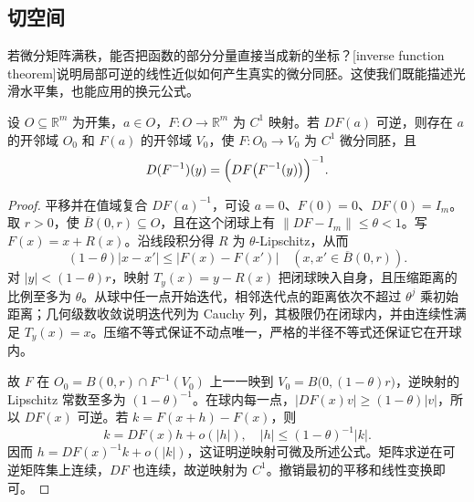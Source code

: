 \subsection{切空间}
\label{b1:subsec:180103}

若微分矩阵满秩，能否把函数的部分分量直接当成新的坐标？[inverse function theorem]说明局部可逆的线性近似如何产生真实的微分同胚。这使我们既能描述光滑水平集，也能应用的换元公式。

\begin{lemma}[局部逆函数]
\label{b1:lem:level-set-local-inverse}
设 \(O\subseteq\mathbb R^m\) 为开集，\(a\in O\)，\(F:O\rightarrow\mathbb R^m\) 为 \(C^1\) 映射。若 \(DF(a)\) 可逆，则存在 \(a\) 的开邻域 \(O_0\) 和 \(F(a)\) 的开邻域 \(V_0\)，使 \(F:O_0\rightarrow V_0\) 为 \(C^1\) 微分同胚，且
\[
 D(F^{-1})(y)=\Bigl(DF\bigl(F^{-1}(y)\bigr)\Bigr)^{-1}.
\]
\end{lemma}
\begin{proof}
平移并在值域复合 \(DF(a)^{-1}\)，可设 \(a=0\)、\(F(0)=0\)、\(DF(0)=I_m\)。取 \(r>0\)，使 \(\overline B(0,r)\subseteq O\)，且在这个闭球上有 \(\|DF-I_m\|\leq\theta<1\)。写 \(F(x)=x+R(x)\)。沿线段积分得 \(R\) 为 \(\theta\)-Lipschitz，从而
\[
 (1-\theta)|x-x'|\leq|F(x)-F(x')|
 \quad(x,x'\in\overline B(0,r)).
\]
对 \(|y|<(1-\theta)r\)，映射 \(T_y(x)=y-R(x)\) 把闭球映入自身，且压缩距离的比例至多为 \(\theta\)。从球中任一点开始迭代，相邻迭代点的距离依次不超过 \(\theta^j\) 乘初始距离；几何级数收敛说明迭代列为 Cauchy 列，其极限仍在闭球内，并由连续性满足 \(T_y(x)=x\)。压缩不等式保证不动点唯一，严格的半径不等式还保证它在开球内。

故 \(F\) 在 \(O_0=B(0,r)\cap F^{-1}(V_0)\) 上一一映到 \(V_0=B\bigl(0,(1-\theta)r\bigr)\)，逆映射的 Lipschitz 常数至多为 \((1-\theta)^{-1}\)。在球内每一点，\(|DF(x)v|\geq(1-\theta)|v|\)，所以 \(DF(x)\) 可逆。若 \(k=F(x+h)-F(x)\)，则
\[
 k=DF(x)h+o(|h|),\quad |h|\leq(1-\theta)^{-1}|k|.
\]
因而 \(h=DF(x)^{-1}k+o(|k|)\)，这证明逆映射可微及所述公式。矩阵求逆在可逆矩阵集上连续，\(DF\) 也连续，故逆映射为 \(C^1\)。撤销最初的平移和线性变换即可。
\end{proof}

